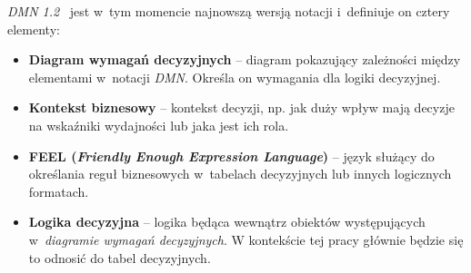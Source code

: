 \emph{DMN 1.2}~\cite{DMN12} jest w~tym momencie najnowszą wersją notacji i~definiuje on cztery elementy:
\begin{itemize}
    \item \textbf{Diagram wymagań decyzyjnych} -- diagram pokazujący zależności między elementami w~notacji \emph{DMN}. Określa on wymagania dla logiki decyzyjnej.
    \item \textbf{Kontekst biznesowy} -- kontekst decyzji, np. jak duży wpływ mają decyzje na wskaźniki wydajności lub jaka jest ich rola.
    \item \textbf{FEEL (\emph{Friendly Enough Expression Language})} -- język służący do określania reguł biznesowych w~tabelach decyzyjnych lub innych logicznych formatach.
    \item \textbf{Logika decyzyjna} -- logika będąca wewnątrz obiektów występujących w~\emph{diagramie wymagań decyzyjnych}. W kontekście tej pracy głównie będzie się to odnosić do tabel decyzyjnych.
\end{itemize}

